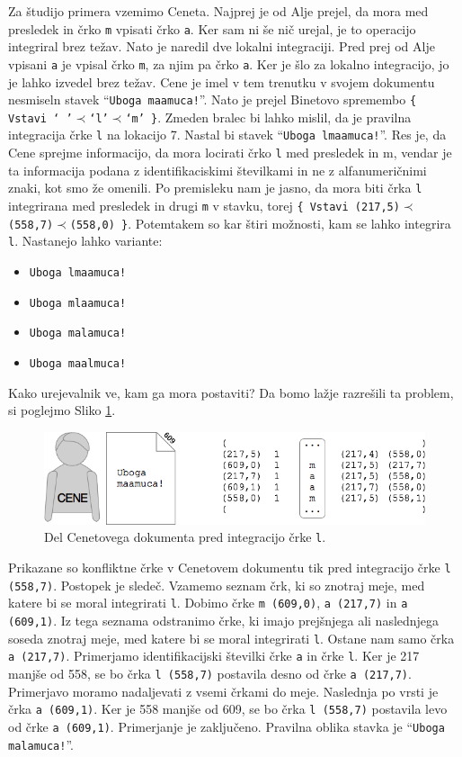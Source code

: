 \documentclass[a4paper, 12pt, twoside]{book}
\begin{document}
Za študijo primera vzemimo Ceneta. Najprej je od Alje prejel, da mora med presledek in črko {\tt m} vpisati črko {\tt a}. Ker sam ni še nič urejal, je to operacijo integriral brez težav. Nato je naredil dve lokalni integraciji. Pred prej od Alje vpisani {\tt a} je vpisal črko {\tt m}, za njim pa črko {\tt a}. Ker je šlo za lokalno integracijo, jo je lahko izvedel brez težav. Cene je imel v tem trenutku v svojem dokumentu nesmiseln stavek “{\tt Uboga maamuca!}”. Nato je prejel Binetovo spremembo {\tt \{ Vstavi ‘ ’$\prec$‘l’$\prec$‘m’ \}}. Zmeden bralec bi lahko mislil, da je pravilna integracija črke {\tt l} na lokacijo 7. Nastal bi stavek “{\tt Uboga lmaamuca!}”. Res je, da Cene sprejme informacijo, da mora locirati črko {\tt l} med presledek in m, vendar je ta informacija podana z identifikaciskimi številkami in ne z alfanumeričnimi znaki, kot smo že omenili. Po premisleku nam je jasno, da mora biti črka {\tt l} integrirana med presledek in drugi {\tt m} v stavku, torej {\tt \{ Vstavi (217,5)$\prec$(558,7)$\prec$(558,0) \}}. Potemtakem so kar štiri možnosti, kam se lahko integrira {\tt l}. Nastanejo lahko variante:

\begin{itemize}
	\item {\tt Uboga lmaamuca!}
	\item {\tt Uboga mlaamuca!}
	\item {\tt Uboga malamuca!}
	\item {\tt Uboga maalmuca!}
\end{itemize}

Kako urejevalnik ve, kam ga mora postaviti? Da bomo lažje razrešili ta problem, si poglejmo Sliko \ref{woot7}.

\begin{figure}[placement h]
\begin{center}
\includegraphics[width=13cm]{woot7.png}
\end{center}
\caption{Del Cenetovega dokumenta pred integracijo črke {\tt l}.}
\label{woot7}
\end{figure}

Prikazane so konfliktne črke v Cenetovem dokumentu tik pred integracijo črke {\tt l (558,7)}. Postopek je sledeč. Vzamemo seznam črk, ki so znotraj meje, med katere bi se moral integrirati {\tt l}. Dobimo črke {\tt m (609,0)}, {\tt a (217,7)} in {\tt a (609,1)}. Iz tega seznama odstranimo črke, ki imajo prejšnjega ali naslednjega soseda znotraj meje, med katere bi se moral integrirati {\tt l}. Ostane nam samo črka {\tt a (217,7)}. Primerjamo identifikacijski številki črke {\tt a} in črke {\tt l}. Ker je 217 manjše od 558, se bo črka {\tt l (558,7)} postavila desno od črke {\tt a (217,7)}. Primerjavo moramo nadaljevati z vsemi črkami do meje. Naslednja po vrsti je črka {\tt a (609,1)}. Ker je 558 manjše od 609, se bo črka {\tt l (558,7)} postavila levo od črke {\tt a (609,1)}. Primerjanje je zaključeno. Pravilna oblika stavka je “{\tt Uboga malamuca!}”.
\end{document}
